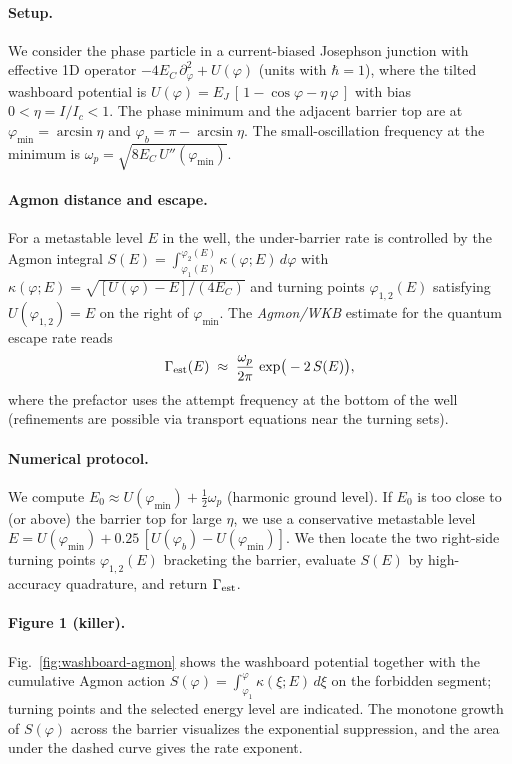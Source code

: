 \documentclass[11pt]{article}
\theoremstyle{definition}
\begin{document}
    \paragraph{Setup.}
    We consider the phase particle in a current-biased Josephson junction with effective 1D operator
    \(-4E_C\,\partial_\varphi^2 + U(\varphi)\) (units with \(\hbar=1\)), where the tilted washboard potential is
    \(U(\varphi)=E_J\,[\,1-\cos\varphi - \eta\,\varphi\,]\) with bias \(0<\eta=I/I_c<1\).
    The phase minimum and the adjacent barrier top are at
    \(\varphi_{\min}=\arcsin\eta\) and \(\varphi_b=\pi-\arcsin\eta\).
    The small-oscillation frequency at the minimum is
    \(\omega_p=\sqrt{8E_C\,U''(\varphi_{\min})}\).
    
    \paragraph{Agmon distance and escape.}
    For a metastable level \(E\) in the well, the under-barrier rate is controlled by the
    Agmon integral \(S(E)=\int_{\varphi_1(E)}^{\varphi_2(E)}\kappa(\varphi;E)\,d\varphi\) with
    \(\kappa(\varphi;E)=\sqrt{[U(\varphi)-E]/(4E_C)}\) and turning points \(\varphi_{1,2}(E)\) satisfying \(U(\varphi_{1,2})=E\) on the right of \(\varphi_{\min}\).
    The \emph{Agmon/WKB} estimate for the quantum escape rate reads
    \[
    \Gamma_{\rm est}(E)\;\approx\;\frac{\omega_p}{2\pi}\,\exp\!\big(-2\,S(E)\big),
    \]
    where the prefactor uses the attempt frequency at the bottom of the well (refinements are possible via transport equations near the turning sets).
    
    \paragraph{Numerical protocol.}
    We compute \(E_0\approx U(\varphi_{\min})+\tfrac{1}{2}\omega_p\) (harmonic ground level).
    If \(E_0\) is too close to (or above) the barrier top for large \(\eta\), we use a conservative metastable level \(E=U(\varphi_{\min})+0.25\,[U(\varphi_b)-U(\varphi_{\min})]\).
    We then locate the two right-side turning points \(\varphi_{1,2}(E)\) bracketing the barrier, evaluate \(S(E)\) by high-accuracy quadrature, and return \(\Gamma_{\rm est}\).
    
    \paragraph{Figure 1 (killer).}
    Fig.~\ref{fig:washboard-agmon} shows the washboard potential together with the cumulative Agmon action \(S(\varphi)=\int_{\varphi_1}^{\varphi}\kappa(\xi;E)\,d\xi\) on the forbidden segment; turning points and the selected energy level are indicated. The monotone growth of \(S(\varphi)\) across the barrier visualizes the exponential suppression, and the area under the dashed curve gives the rate exponent.
    
\end{document}
